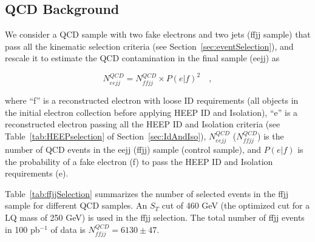 \documentclass{cmspaper}
\begin{document}
\begin{linenumbers}
%
%

\subsection{QCD Background} \label{sec:QCDBackground}

We consider a QCD sample with two fake electrons and two jets (ffjj sample)
that pass all the kinematic selection criteria (see Section~\ref{sec:eventSelection}), and rescale it to estimate 
the QCD contamination in the final sample (eejj) as

%
\begin{equation} \label{QCDRescaling}
N_{eejj}^{QCD} = N_{ffjj}^{QCD} \times {P(e|f)}^2 \quad , 
\end{equation}
%

where ``f'' is a reconstructed electron with loose ID requirements (all objects in the initial electron collection 
before applying HEEP ID and Isolation), 
``e'' is a reconstructed electron passing all the HEEP ID and Isolation criteria (see Table~\ref{tab:HEEPselection} 
of Section~\ref{sec:IdAndIso}), 
$N_{eejj}^{QCD}$ ($N_{ffjj}^{QCD}$) is the number of QCD events in the eejj (ffjj) sample (control sample), 
and $P(e|f)$ is the probability of a fake electron (f) to pass the HEEP ID and Isolation requirements (e).

Table~\ref{tab:ffjjSelection} summarizes 
the number of selected events in the ffjj sample for different QCD samples.
An $S_{T}$ cut of 460 GeV 
(the optimized cut for a LQ mass of 250 GeV) is used in the ffjj selection.
The total number of ffjj events in 100 pb$^{-1}$ of data is $N_{ffjj}^{QCD}=6130 \pm 47$.


\end{linenumbers}
\end{document}
